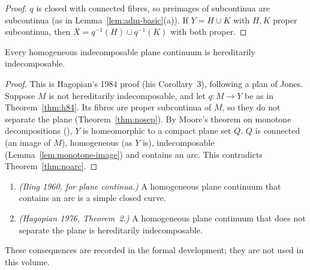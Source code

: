 \begin{proof}
$q$ is closed with connected fibres, so preimages of subcontinua are subcontinua (as in Lemma~\ref{lem:adm-basic}(a)). If $Y=H\cup K$ with $H,K$
proper subcontinua, then $X=q^{-1}(H)\cup q^{-1}(K)$ with both proper.
\end{proof}


\begin{theorem}\label{thm:HI}
Every homogeneous indecomposable plane continuum is hereditarily indecomposable.
\end{theorem}

\begin{proof}
This is Hagopian's 1984 proof (his Corollary~3), following a plan of Jones. Suppose $M$ is not hereditarily indecomposable, and let $q\colon M\to Y$ be
as in Theorem~\ref{thm:h84}. Its fibres are proper subcontinua of $M$, so they do not separate the plane (Theorem~\ref{thm:nosep}). By Moore's
theorem on monotone decompositions (), $Y$ is homeomorphic to a compact plane set $Q$. $Q$ is connected (an image of $M$),
homogeneous (as $Y$ is), indecomposable (Lemma~\ref{lem:monotone-image}) and contains an arc. This contradicts Theorem~\ref{thm:noarc}.
\end{proof}


\begin{corollary}\label{cor:bing60}
\leavevmode
\begin{enumerate}[label=(\alph*)]
\item \emph{(Bing 1960, for plane continua.)} A homogeneous plane continuum that contains an arc is a simple closed curve.
\item \emph{(Hagopian 1976, Theorem~2.)} A homogeneous plane continuum that does not separate the plane is hereditarily indecomposable.
\end{enumerate}
\end{corollary}

These consequences are recorded in the formal development; they are not used in this volume.


